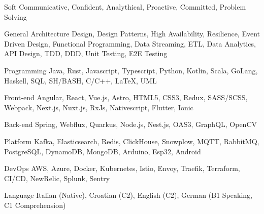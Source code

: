 
\begin{cvskills}

  \cvskill
    {Soft} %
    {Communicative, Confident, Analythical, Proactive, Committed, Problem Solving} %

  \cvskill
    {General} %
    {Architecture Design, Design Patterns, High Availability, Resilience, Event Driven Design, Functional Programming,\newline
    Data Streaming, ETL, Data Analytics, API Design, TDD, DDD, Unit Testing, E2E Testing} %

  \cvskill
    {Programming} %
    {Java, Rust, Javascript, Typescript, Python, Kotlin, Scala, GoLang, Haskell, SQL, SH/BASH, C/C++, LaTeX, UML} %

  \cvskill
    {Front-end} %
    {Angular, React, Vue.js, Astro, HTML5, CSS3, Redux, SASS/SCSS, Webpack, Next.js, Nuxt.js, RxJs, Nativescript, Flutter, Ionic} %
    
  \cvskill
    {Back-end} %
    {Spring, Webflux, Quarkus, Node.js, Nest.js, OAS3, GraphQL, OpenCV} %

  \cvskill
    {Platform} %
    {Kafka, Elasticsearch, Redis, ClickHouse, Snowplow, MQTT, RabbitMQ, PostgreSQL, DynamoDB, MongoDB, Arduino, Esp32,\newline
    Android} %

  \cvskill
    {DevOps} %
    {AWS, Azure, Docker, Kubernetes, Istio, Envoy, Traefik, Terraform, CI/CD, NewRelic, Splunk, Sentry} %

  \cvskill
    {Language} %
    {Italian (Native), Croatian (C2), English (C2), German (B1 Speaking, C1 Comprehension)} %

\end{cvskills}
